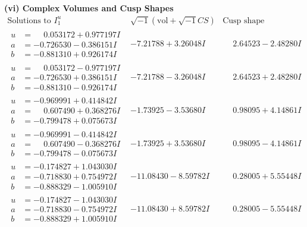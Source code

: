 \documentclass[1p]{elsarticle_modified}
\theoremstyle{definition}
\newcommand{\I}{\sqrt{-1}}
\begin{document}
\newpage\flushleft \textbf{(vi) Complex Volumes and Cusp Shapes}
$$\begin{array}{c|c|c}  
\text{Solutions to }I^u_{1}& \I (\text{vol} + \sqrt{-1}CS) & \text{Cusp shape}\\
 \hline 
\begin{aligned}
u &= \phantom{-}0.053172 + 0.977197 I \\
a &= -0.726530 - 0.386151 I \\
b &= -0.881310 + 0.926174 I\end{aligned}
 & -7.21788 + 3.26048 I & \phantom{-}2.64523 - 2.48280 I \\ \hline\begin{aligned}
u &= \phantom{-}0.053172 - 0.977197 I \\
a &= -0.726530 + 0.386151 I \\
b &= -0.881310 - 0.926174 I\end{aligned}
 & -7.21788 - 3.26048 I & \phantom{-}2.64523 + 2.48280 I \\ \hline\begin{aligned}
u &= -0.969991 + 0.414842 I \\
a &= \phantom{-}0.607490 + 0.368276 I \\
b &= -0.799478 + 0.075673 I\end{aligned}
 & -1.73925 - 3.53680 I & \phantom{-}0.98095 + 4.14861 I \\ \hline\begin{aligned}
u &= -0.969991 - 0.414842 I \\
a &= \phantom{-}0.607490 - 0.368276 I \\
b &= -0.799478 - 0.075673 I\end{aligned}
 & -1.73925 + 3.53680 I & \phantom{-}0.98095 - 4.14861 I \\ \hline\begin{aligned}
u &= -0.174827 + 1.043030 I \\
a &= -0.718830 + 0.754972 I \\
b &= -0.888329 - 1.005910 I\end{aligned}
 & -11.08430 - 8.59782 I & \phantom{-}0.28005 + 5.55448 I \\ \hline\begin{aligned}
u &= -0.174827 - 1.043030 I \\
a &= -0.718830 - 0.754972 I \\
b &= -0.888329 + 1.005910 I\end{aligned}
 & -11.08430 + 8.59782 I & \phantom{-}0.28005 - 5.55448 I \\ \hline\begin{aligned}

\end{aligned}
\end{array}$$
\end{document}
